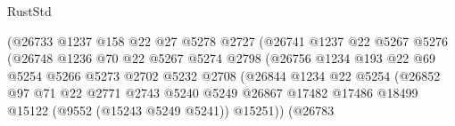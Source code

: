 \begin{lexlean}{RustStd}
\begin{coremodule}
                                      (@26733
                                        @1237
                                        @158
                                        @22
                                        @27
                                        @5278
                                        @2727
                                        (@26741
                                          @1237
                                          @22
                                          @5267
                                          @5276
                                          (@26748
                                            @1236
                                            @70
                                            @22
                                            @5267
                                            @5274
                                            @2798
                                            (@26756
                                              @1234
                                              @193
                                              @22
                                              @69
                                              @5254
                                              @5266
                                              @5273
                                              @2702
                                              @5232
                                              @2708
                                              (@26844
                                                @1234
                                                @22
                                                @5254
                                                (@26852
                                                  @97
                                                  @71
                                                  @22
                                                  @2771
                                                  @2743
                                                  @5240
                                                  @5249
                                                  @26867
                                                  @17482
                                                  @17486
                                                  @18499
                                                  @15122
                                                  (@9552 (@15243 @5249 @5241))
                                                  @15251))
                                              (@26783

\end{coremodule}
\end{lexlean}
